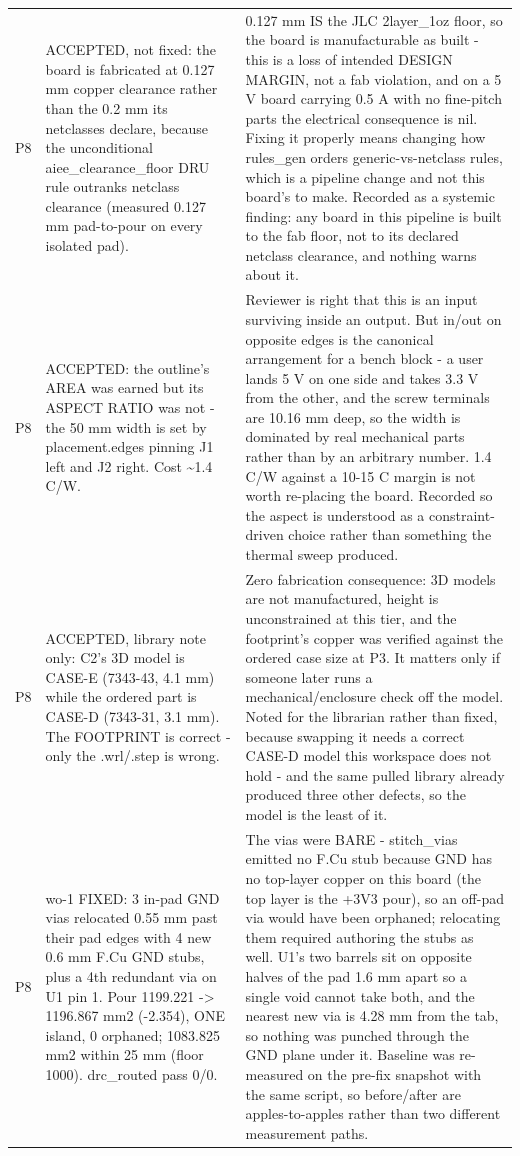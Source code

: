\documentclass[11pt,a4paper]{article}
\begin{document}
{\begin{longtable}{lp{5.2cm}p{7.2cm}}
P8 & ACCEPTED, not fixed: the board is fabricated at 0.127 mm copper clearance rather than the 0.2 mm its netclasses declare, because the unconditional aiee\_clearance\_floor DRU rule outranks netclass clearance (measured 0.127 mm pad-to-pour on every isolated pad). & 0.127 mm IS the JLC 2layer\_1oz floor, so the board is manufacturable as built - this is a loss of intended DESIGN MARGIN, not a fab violation, and on a 5 V board carrying 0.5 A with no fine-pitch parts the electrical consequence is nil. Fixing it properly means changing how rules\_gen orders generic-vs-netclass rules, which is a pipeline change and not this board's to make. Recorded as a systemic finding: any board in this pipeline is built to the fab floor, not to its declared netclass clearance, and nothing warns about it. \\
P8 & ACCEPTED: the outline's AREA was earned but its ASPECT RATIO was not - the 50 mm width is set by placement.edges pinning J1 left and J2 right. Cost \textasciitilde{}1.4 C/W. & Reviewer is right that this is an input surviving inside an output. But in/out on opposite edges is the canonical arrangement for a bench block - a user lands 5 V on one side and takes 3.3 V from the other, and the screw terminals are 10.16 mm deep, so the width is dominated by real mechanical parts rather than by an arbitrary number. 1.4 C/W against a 10-15 C margin is not worth re-placing the board. Recorded so the aspect is understood as a constraint-driven choice rather than something the thermal sweep produced. \\
P8 & ACCEPTED, library note only: C2's 3D model is CASE-E (7343-43, 4.1 mm) while the ordered part is CASE-D (7343-31, 3.1 mm). The FOOTPRINT is correct - only the .wrl/.step is wrong. & Zero fabrication consequence: 3D models are not manufactured, height is unconstrained at this tier, and the footprint's copper was verified against the ordered case size at P3. It matters only if someone later runs a mechanical/enclosure check off the model. Noted for the librarian rather than fixed, because swapping it needs a correct CASE-D model this workspace does not hold - and the same pulled library already produced three other defects, so the model is the least of it. \\
P8 & wo-1 FIXED: 3 in-pad GND vias relocated 0.55 mm past their pad edges with 4 new 0.6 mm F.Cu GND stubs, plus a 4th redundant via on U1 pin 1. Pour 1199.221 -\textgreater{} 1196.867 mm2 (-2.354), ONE island, 0 orphaned; 1083.825 mm2 within 25 mm (floor 1000). drc\_routed pass 0/0. & The vias were BARE - stitch\_vias emitted no F.Cu stub because GND has no top-layer copper on this board (the top layer is the +3V3 pour), so an off-pad via would have been orphaned; relocating them required authoring the stubs as well. U1's two barrels sit on opposite halves of the pad 1.6 mm apart so a single void cannot take both, and the nearest new via is 4.28 mm from the tab, so nothing was punched through the GND plane under it. Baseline was re-measured on the pre-fix snapshot with the same script, so before/after are apples-to-apples rather than two different measurement paths. \\

\end{longtable}}
\end{document}
